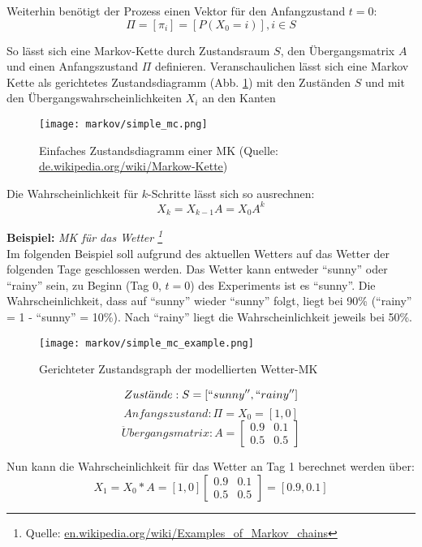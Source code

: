 Weiterhin benötigt der Prozess einen Vektor für den Anfangzustand \( t = 0 \):
\[ \Pi = [ \pi_i] = [ P (X_0 = i) ] , i \in S \]

So lässt sich eine Markov-Kette durch Zustandsraum \(S\), den Übergangsmatrix \( A \) und einen Anfangszustand \( \Pi \) definieren.
Veranschaulichen lässt sich eine Markov Kette als gerichtetes Zustandsdiagramm (Abb. \ref{fig:simple_mc}) mit den Zuständen \(S\) und 
mit den Übergangswahrscheinlichkeiten \(X_i\) an den Kanten
\begin{figure}[htbp] \centering
    \texttt{[image: markov/simple\_mc.png]}
    \caption{Einfaches Zustandsdiagramm einer \acl{MK} (Quelle: \url{de.wikipedia.org/wiki/Markow-Kette})}
    \label{fig:simple_mc}
\end{figure}

Die Wahrscheinlichkeit für \( k \)-Schritte lässt sich so ausrechnen: 
\[ X_k = X_{k-1} A = X_0 A^k \] 


\textbf{Beispiel:} 
\textit{ \acl{MK} für das Wetter \footnote{Quelle: \url{en.wikipedia.org/wiki/Examples_of_Markov_chains}}} \\
Im folgenden Beispiel soll aufgrund des aktuellen Wetters auf das Wetter der folgenden Tage geschlossen werden.
Das Wetter kann entweder ``sunny'' oder ``rainy'' sein, zu Beginn (Tag 0, \( t = 0 \)) des Experiments ist es ``sunny''.
Die Wahrscheinlichkeit, dass auf ``sunny'' wieder ``sunny'' folgt, liegt bei 90\% (``rainy'' = 1 - ``sunny'' = 10\%). 
Nach ``rainy'' liegt die Wahrscheinlichkeit jeweils bei 50\%.  
\begin{figure}[htbp] \centering
    \texttt{[image: markov/simple\_mc\_example.png]}
    \caption{ Gerichteter Zustandsgraph der modellierten Wetter-\acl{MK} }
    \label{fig:simple_mc_example}
\end{figure}


\[ Zust\ddot{a}nde: S = [``sunny'', ``rainy''] \]
\[ Anfangszustand:  \Pi = X_0 = [1 , 0] \]
\[\ddot{U}bergangsmatrix: A = \begin {bmatrix} 0.9&0.1\\0.5&0.5 \end {bmatrix}
\]

Nun kann die Wahrscheinlichkeit für das Wetter an Tag 1 berechnet werden über: \\
\[ X_1 = X_0 * A = [ 1, 0 ] \begin {bmatrix} 0.9&0.1\\0.5&0.5 \end {bmatrix} = [ 0.9, 0.1] \]

